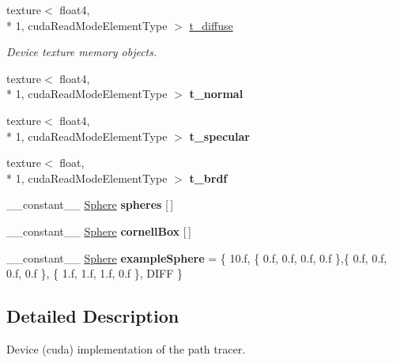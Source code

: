 \begin{DoxyCompactItemize}
\item 
\hypertarget{PathTracer_8cu_a5aedfe43232fa7feb8f8f9f2ffcc2a7c}{texture$<$ float4, \\*
1, cuda\-Read\-Mode\-Element\-Type $>$ \hyperlink{PathTracer_8cu_a5aedfe43232fa7feb8f8f9f2ffcc2a7c}{t\-\_\-diffuse}}\label{PathTracer_8cu_a5aedfe43232fa7feb8f8f9f2ffcc2a7c}

\begin{DoxyCompactList}\small\item\em Device texture memory objects. \end{DoxyCompactList}\item 
\hypertarget{PathTracer_8cu_a6a7be04f28a49c5de6198ffdd141f535}{texture$<$ float4, \\*
1, cuda\-Read\-Mode\-Element\-Type $>$ {\bfseries t\-\_\-normal}}\label{PathTracer_8cu_a6a7be04f28a49c5de6198ffdd141f535}

\item 
\hypertarget{PathTracer_8cu_a0c37a5ddd8cdb941f5a67d99c23f2116}{texture$<$ float4, \\*
1, cuda\-Read\-Mode\-Element\-Type $>$ {\bfseries t\-\_\-specular}}\label{PathTracer_8cu_a0c37a5ddd8cdb941f5a67d99c23f2116}

\item 
\hypertarget{PathTracer_8cu_a418288dac1003cc592ea1f31b80a0924}{texture$<$ float, \\*
1, cuda\-Read\-Mode\-Element\-Type $>$ {\bfseries t\-\_\-brdf}}\label{PathTracer_8cu_a418288dac1003cc592ea1f31b80a0924}

\item 
\-\_\-\-\_\-constant\-\_\-\-\_\- \hyperlink{structSphere}{Sphere} {\bfseries spheres} \mbox{[}$\,$\mbox{]}
\item 
\-\_\-\-\_\-constant\-\_\-\-\_\- \hyperlink{structSphere}{Sphere} {\bfseries cornell\-Box} \mbox{[}$\,$\mbox{]}
\item 
\hypertarget{PathTracer_8cu_a119aa674eb10f7fdb207268b935a0771}{\-\_\-\-\_\-constant\-\_\-\-\_\- \hyperlink{structSphere}{Sphere} {\bfseries example\-Sphere} = \{ 10.f, \{ 0.f, 0.f, 0.f, 0.f \},\{ 0.f, 0.f, 0.f, 0.f \}, \{ 1.f, 1.f, 1.f, 0.f \}, D\-I\-F\-F \}}\label{PathTracer_8cu_a119aa674eb10f7fdb207268b935a0771}

\end{DoxyCompactItemize}


\subsection{Detailed Description}
Device (cuda) implementation of the path tracer. 

